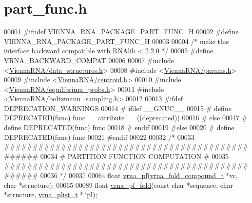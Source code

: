 \hypertarget{part__func_8h_source}{}\section{part\+\_\+func.\+h}
\label{part__func_8h_source}

\begin{DoxyCode}
00001 \textcolor{preprocessor}{#ifndef VIENNA\_RNA\_PACKAGE\_PART\_FUNC\_H}
00002 \textcolor{preprocessor}{#define VIENNA\_RNA\_PACKAGE\_PART\_FUNC\_H}
00003 
00004 \textcolor{comment}{/* make this interface backward compatible with RNAlib < 2.2.0 */}
00005 \textcolor{preprocessor}{#define VRNA\_BACKWARD\_COMPAT}
00006 
00007 \textcolor{preprocessor}{#include <\hyperlink{data__structures_8h}{ViennaRNA/data\_structures.h}>}
00008 \textcolor{preprocessor}{#include <\hyperlink{params_8h}{ViennaRNA/params.h}>}
00009 \textcolor{preprocessor}{#include <\hyperlink{centroid_8h}{ViennaRNA/centroid.h}>}
00010 \textcolor{preprocessor}{#include <\hyperlink{equilibrium__probs_8h}{ViennaRNA/equilibrium\_probs.h}>}
00011 \textcolor{preprocessor}{#include <\hyperlink{boltzmann__sampling_8h}{ViennaRNA/boltzmann\_sampling.h}>}
00012 
00013 \textcolor{preprocessor}{#ifdef DEPRECATION\_WARNINGS}
00014 \textcolor{preprocessor}{# ifdef \_\_GNUC\_\_}
00015 \textcolor{preprocessor}{#  define DEPRECATED(func) func \_\_attribute\_\_ ((deprecated))}
00016 \textcolor{preprocessor}{# else}
00017 \textcolor{preprocessor}{#  define DEPRECATED(func) func}
00018 \textcolor{preprocessor}{# endif}
00019 \textcolor{preprocessor}{#else}
00020 \textcolor{preprocessor}{# define DEPRECATED(func) func}
00021 \textcolor{preprocessor}{#endif}
00022 
00032 \textcolor{comment}{/*}
00033 \textcolor{comment}{#################################################}
00034 \textcolor{comment}{# PARTITION FUNCTION COMPUTATION                #}
00035 \textcolor{comment}{#################################################}
00036 \textcolor{comment}{*/}
00037 
00064 \textcolor{keywordtype}{float} \hyperlink{group__pf__fold_ga29e256d688ad221b78d37f427e0e99bc}{vrna\_pf}(\hyperlink{group__fold__compound_structvrna__fc__s}{vrna\_fold\_compound\_t} *vc, \textcolor{keywordtype}{char} *structure);
00065 
00089 \textcolor{keywordtype}{float} \hyperlink{group__pf__fold_gafe8f523e16575e6e61bf8ff909663b5f}{vrna\_pf\_fold}(\textcolor{keyword}{const} \textcolor{keywordtype}{char} *sequence, \textcolor{keywordtype}{char} *structure, 
      \hyperlink{group__data__structures_structvrna__plist__s}{vrna\_plist\_t} **pl);

\end{DoxyCode}
